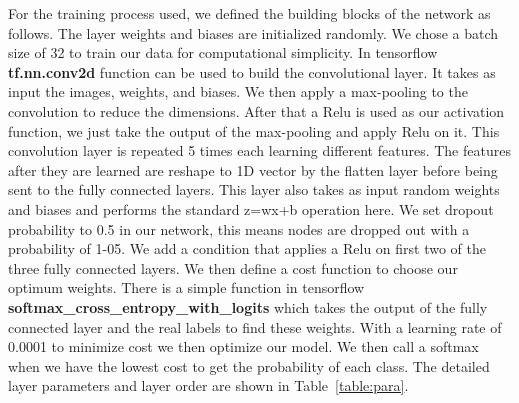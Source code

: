 \documentclass[12pt, a4paper,oneside]{report}
\begin{document}
For the training process used, we defined the building blocks of the network as follows. The layer weights and biases are initialized randomly. We chose a batch size of 32 to train our data for computational simplicity. In tensorflow \textbf{tf.nn.conv2d} function can be used to build the convolutional layer. It takes as input the images, weights, and biases. We then apply a max-pooling to the convolution to reduce the dimensions. After that a Relu is used as our activation function, we just take the output of the max-pooling and apply Relu on it. This convolution layer is repeated 5 times each learning different features. The features after they are learned are reshape to 1D vector by the flatten layer before being sent to the fully connected layers. This layer also takes as input random weights and biases and performs the standard z=wx+b operation here. We set dropout probability to 0.5 in our network, this means nodes are dropped out with a probability of 1-05. We add a condition that applies a Relu on first two of the three fully connected layers. We then define a cost function to choose our optimum weights. There is a simple function in tensorflow \textbf{softmax\_cross\_entropy\_with\_logits} which takes the output of the fully connected layer and the real labels to find these weights. With a learning rate of 0.0001 to minimize cost we then optimize our model. We then call a softmax when we have the lowest cost to get the probability of each class. The detailed layer parameters and layer order are shown in Table~\ref{table:para}. 
\end{document}
